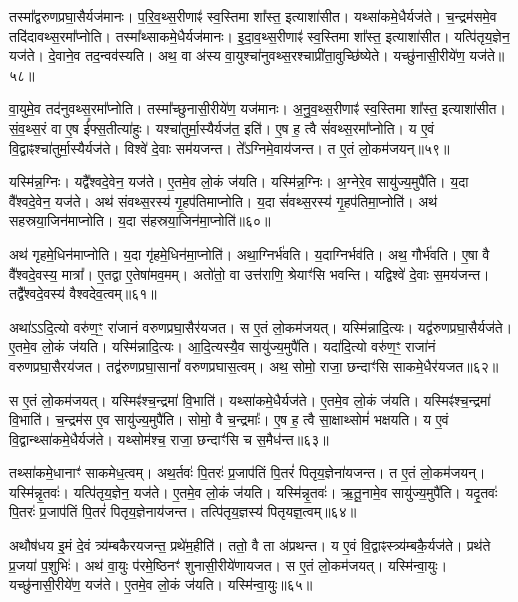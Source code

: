 तस्मा᳚द्वरुणप्रघा॒सैर्यज॑मानः।
प॒रि॒व॒थ्स॒रीणाꣴ॑ स्व॒स्तिमा शा᳚स्त॒ इत्याशा॑सीत।
यथ्सा॑कमे॒धैर्यज॑ते।
च॒न्द्रम॑समे॒व तदि॑दावथ्स॒र\-मा᳚प्नोति।
तस्मा᳚थ्साकमे॒धैर्यज॑मानः।
इ॒दा॒\-व॒थ्स॒रीणाꣴ॑ स्व॒स्तिमा शा᳚स्त॒ इत्याशा॑सीत।
यत्पि॑तृय॒ज्ञेन॒ यज॑ते।
दे॒वाने॒व तद॒न्वव॑स्यति।
अथ॒ वा अ॑स्य वा॒युश्चा॑नु\-वथ्स॒रश्चाप्री॑ता॒\-वुच्छि॑ष्येते।
यच्छु॑नासी॒रीये॑ण॒ यज॑ते॥५८॥

वा॒युमे॒व तद॑नुवथ्स॒रमा᳚प्नोति।
तस्मा᳚च्छुनासी॒रीये॑ण॒ यज॑मानः।
अ॒नु॒व॒थ्स॒रीणाꣴ॑ स्व॒स्तिमा शा᳚स्त॒ इत्याशा॑सीत।
सं॒व॒थ्स॒रं वा ए॒ष ई᳚फ्स॒तीत्या॑हुः।
यश्चा॑तुर्मा॒स्यैर्यज॑त॒ इति॑।
ए॒ष ह॒ त्वै सं॑वथ्स॒रमा᳚प्नोति।
य ए॒वं वि॒द्वाꣴश्चा॑तुर्मा॒स्यैर्यज॑ते।
विश्वे॑ दे॒वाः सम॑यजन्त।
ते᳚ऽग्निमे॒वाय॑जन्त।
त ए॒तं लो॒कम॑जयन्॥५९॥

यस्मि॑न्न॒ग्निः।
यद्वै᳚श्वदे॒वेन॒ यज॑ते।
ए॒तमे॒व लो॒कं ज॑यति।
यस्मि॑न्न॒ग्निः।
अ॒ग्नेरे॒व सायु॑ज्य॒मुपै॑ति।
य॒दा वै᳚श्वदे॒वेन॒ यज॑ते।
अथ॑ संवथ्स॒रस्य॑ गृ॒हप॑तिमाप्नोति।
य॒दा सं॑वथ्स॒रस्य॑ गृ॒हप॑तिमा॒प्नोति॑।
अथ॑ सहस्रया॒जिन॑माप्नोति।
य॒दा स॑हस्रया॒जिन॑मा॒प्नोति॑॥६०॥

अथ॑ गृहमे॒धिन॑माप्नोति।
य॒दा गृ॑हमे॒धिन॑मा॒प्नोति॑।
अथा॒ग्निर्भ॑वति।
य॒दाग्निर्भव॑ति।
अथ॒ गौर्भ॑वति।
ए॒षा वै वै᳚श्वदे॒वस्य॒ मात्रा᳚।
ए॒तद्वा ए॒तेषा॑मव॒मम्।
अतो॑तो॒ वा उत्त॑राणि॒ श्रेयाꣳ॑सि भवन्ति।
यद्विश्वे॑ दे॒वाः स॒मय॑जन्त।
तद्वै᳚श्वदे॒वस्य॑ वैश्वदेव॒त्वम्॥६१॥

अथा॑ऽऽदि॒त्यो वरु॑ण॒ꣳ॒ रा॑जानं वरुणप्रघा॒सैर॑यजत।
स ए॒तं लो॒कम॑जयत्।
यस्मि॑न्नादि॒त्यः।
यद्व॑रुणप्रघा॒सैर्यज॑ते।
ए॒तमे॒व लो॒कं ज॑यति।
यस्मि॑न्नादि॒त्यः।
आ॒दि॒त्यस्यै॒व सायु॑ज्य॒मुपै॑ति।
यदा॑दि॒त्यो वरु॑ण॒ꣳ॒ राजा॑नं वरुणप्रघा॒सै\-रय॑जत।
तद्व॑रुणप्रघा॒सानां᳚ वरुणप्रघास॒त्वम्।
अथ॒ सोमो॒ राजा॒ छन्दाꣳ॑सि साकमे॒धैर॑यजत॥६२॥

स ए॒तं लो॒कम॑जयत्।
यस्मिꣴ॑श्च॒न्द्रमा॑ वि॒भाति॑।
यथ्सा॑कमे॒धैर्यज॑ते।
ए॒तमे॒व लो॒कं ज॑यति।
यस्मिꣴ॑श्च॒न्द्रमा॑ वि॒भाति॑।
च॒न्द्रम॑स ए॒व सायु॑ज्य॒मुपै॑ति।
सोमो॒ वै च॒न्द्रमाः᳚।
ए॒ष ह॒ त्वै सा॒क्षाथ्सोमं॑ भक्षयति।
य ए॒वं वि॒द्वान्थ्सा॑कमे॒धैर्यज॑ते।
यथ्सोम॑श्च॒ राजा॒ छन्दाꣳ॑सि च स॒मैध॑न्त॥६३॥

तथ्सा॑कमे॒धानाꣳ॑ साकमेध॒त्वम्।
अथ॒र्तवः॑ पि॒तरः॑ प्र॒जा\-प॑तिं पि॒तरं॑ पितृय॒ज्ञेना॑यजन्त।
त ए॒तं लो॒कम॑जयन्।
यस्मि॑न्नृ॒तवः॑।
यत्पि॑तृय॒ज्ञेन॒ यज॑ते।
ए॒तमे॒व लो॒कं ज॑यति।
यस्मि॑न्नृ॒तवः॑।
ऋ॒तू॒नामे॒व सायु॑ज्य॒मुपै॑ति।
यदृ॒तवः॑ पि॒तरः॑ प्र॒जा\-प॑तिं पि॒तरं॑ पितृय॒ज्ञेनाय॑जन्त।
तत्पि॑तृय॒ज्ञस्य॑ पितृयज्ञ॒त्वम्॥६४॥

अथौष॑धय इ॒मं दे॒वं त्र्य॑म्बकैरयजन्त॒ प्रथे॑म॒हीति॑।
ततो॒ वै ता अ॑प्रथन्त।
य ए॒वं वि॒द्वाꣴस्त्र्य॑म्बकै॒र्यज॑ते।
प्रथ॑ते प्र॒जया॑ प॒शुभिः॑।
अथ॑ वा॒युः प॑रमे॒ष्ठिनꣳ॑ शुनासी॒रीये॑णायजत।
स ए॒तं लो॒कम॑जयत्।
यस्मि॑न्वा॒युः।
यच्छु॑नासी॒रीये॑ण॒ यज॑ते।
ए॒तमे॒व लो॒कं ज॑यति।
यस्मि॑न्वा॒युः॥६५॥


